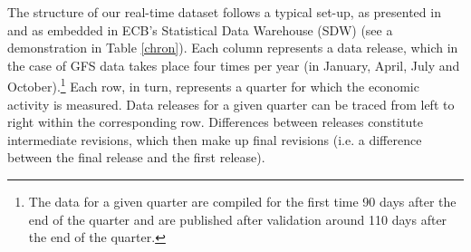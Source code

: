The structure of our real-time dataset follows a typical set-up, as
presented in \citet{diebold_rudebusch} and as embedded in ECB's Statistical
Data Warehouse (SDW) (see a demonstration in Table \ref{chron}).
Each column represents a data release, which in the case of GFS data
takes place four times per year (in January, April, July and October).\footnote{The data for a given quarter are compiled for the first time 90 days
 after the end of the quarter and are published after validation
around 110 days after the end of the quarter. } Each row, in turn, represents a quarter 
for which the economic activity is measured. Data releases for a given quarter can be traced from
left to right within the corresponding row. Differences between releases
constitute intermediate revisions, which then make up final revisions
(i.e. a difference between the final release and the first release).

